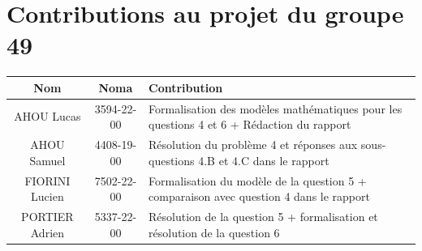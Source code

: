 \documentclass{article}
\begin{document}
\newpage
\thispagestyle{empty}
\section*{Contributions au projet du groupe 49}
\begin{table}[h]
    \centering
    \renewcommand{\arraystretch}{2}
    \begin{tabular}{|c|c|p{8cm}|}
        \hline
        \textbf{Nom} & \textbf{Noma} & \textbf{Contribution} \\
        \hline
        AHOU Lucas & 3594-22-00 & Formalisation des modèles mathématiques pour les questions 4 et 6 + Rédaction du rapport \\
        \hline
        AHOU Samuel & 4408-19-00 & Résolution du problème 4 et réponses aux sous-questions 4.B et 4.C dans le rapport \\
        \hline
        FIORINI Lucien & 7502-22-00 & Formalisation du modèle de la question 5 + comparaison avec question 4 dans le rapport\\
        \hline
        PORTIER Adrien & 5337-22-00 & Résolution de la question 5 +  formalisation et résolution de la question 6\\
        \hline
    \end{tabular}
\end{table}
\end{document}
